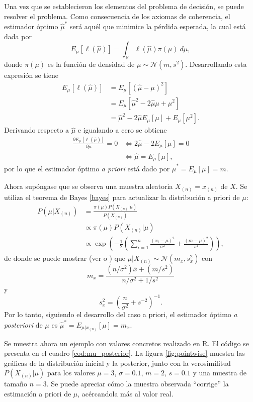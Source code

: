 \documentclass[11pt,a4paper]{article}
\begin{document}
Una vez que se establecieron los elementos del problema de decisión, se puede resolver el problema. Como consecuencia de los axiomas de coherencia, el estimador óptimo $\hat{\mu}^*$ será aquél que minimice la pérdida esperada, la cual está dada por $$E_{\mu}[\ell (\hat{\mu})] = \int_{\mathbb{R}} \ell(\hat{\mu})\pi (\mu) \ d\mu,$$ donde $\pi (\mu)$ es la función de densidad de $\mu \sim \mathcal{N}(m, s^2)$. Desarrollando esta expresión se tiene
\begin{align*}
E_{\mu}[\ell (\hat{\mu})] &= E_{\mu}[(\hat{\mu} - \mu)^2]\\
&=  E_{\mu}[\hat{\mu}^2 - 2\hat{\mu}\mu + \mu^2]\\
&= \hat{\mu}^2 -2\hat{\mu}E_{\mu}[\mu] + E_{\mu}[\mu^2].
\end{align*}
Derivando respecto a $\hat{\mu}$ e igualando a cero se obtiene
\begin{align*}
\frac{\partial E_{\mu}[\ell (\hat{\mu})]}{\partial \hat{\mu}} = 0 &\iff 2\hat{\mu} - 2E_{\mu}[\mu] = 0\\
&\iff \hat{\mu} = E_{\mu}[\mu],
\end{align*}
por lo que el estimador óptimo \textit{a priori} está dado por $\hat{\mu}^* = E_{\mu}[\mu] = m$.

Ahora supóngase que se observa una muestra aleatoria $X_{(n)} = x_{(n)}$ de $X$. Se utiliza el teorema de Bayes \eqref{bayes} para actualizar la distribución a priori de $\mu$:
\begin{align*}
P(\mu | X_{(n)}) &= \frac{\pi (\mu) P(X_{(n)}|\mu)}{P(X_{(n)})}\\
&\propto \pi (\mu) P(X_{(n)}|\mu)\\
&\propto \exp\left( -\frac{1}{2} \left( \sum_{i=1}^n \frac{(x_i - \mu)^2}{\sigma^2} + \frac{(m - \mu)^2}{s^2}\right) \right),
\end{align*}
de donde se puede mostrar (ver  \citet{mendoza} o \citet{gelman}) que $\mu | X_{(n)} \sim \mathcal{N}(m_x, s_x^2)$ con $$m_x = \frac{(n / \sigma^2) \bar{x} + (m/s^2)}{n/\sigma^2 + 1/s^2}$$ y $$s_x^2 = \left( \frac{n}{\sigma^2} + s^{-2}\right)^{-1}.$$ Por lo tanto, siguiendo el desarrollo del caso a priori, el estimador óptimo \textit{a posteriori} de $\mu$ es $\hat{\mu}^* = E_{\mu | x_{(n)}}[\mu] = m_x$.

Se muestra ahora un ejemplo con valores concretos realizado en R.  El código se presenta en el cuadro \ref{cod:mu_posterior}. La figura \ref{fig:pointwise} muestra las gráficas de la distribución inicial y la posterior, junto con la verosimilitud $P(X_{(n)}|\mu)$ para los valores $\mu = 3$, $\sigma = 0.1$, $m = 2$, $s = 0.1$ y una muestra de tamaño $n = 3$. Se puede apreciar cómo la muestra observada ``corrige'' la estimación a priori de $\mu$, acércandola más al valor real.
\end{document}
